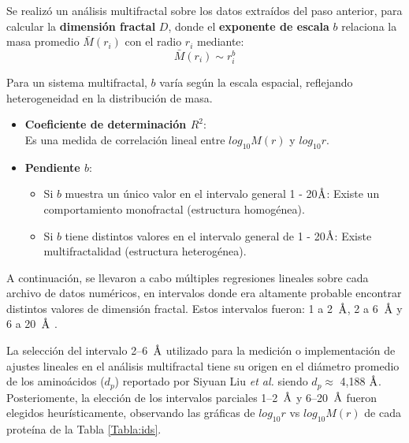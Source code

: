	Se realiz\'{o} un an\'{a}lisis multifractal sobre los datos extra\'{i}dos del paso anterior, para calcular la \textbf{dimensi\'{o}n fractal} $D$, donde el \textbf{exponente de escala} $b$  relaciona la masa  promedio $\bar{M}(r_i)$ con el radio $r_{i}$ mediante:
	\begin{equation}
		\bar{M}(r_i) \sim r_{i}^b
	\end{equation}
	
	Para un sistema multifractal, $b$ var\'{i}a seg\'{u}n la escala espacial, reflejando heterogeneidad en la distribuci\'{o}n de masa.
	\begin{itemize}
		\item \textbf{Coeficiente de determinaci\'{o}n $R^{2}$}: \\ Es una medida de correlaci\'{o}n lineal entre $log_{10}M(r)$ y $log_{10}r$.
		\item \textbf{Pendiente $b$}:
		\begin{itemize}
			\item Si $b$ muestra un \'{u}nico valor en el intervalo general 1 - 20$\textup{\r{A}}$: Existe un comportamiento monofractal (estructura homog\'{e}nea).
			\item Si $b$  tiene distintos valores en el intervalo general de 1 - 20$\textup{\r{A}}$: Existe multifractalidad (estructura heterog\'{e}nea).
		\end{itemize}
	\end{itemize}
	
	A continuaci\'{o}n, se llevaron a cabo m\'{u}ltiples regresiones lineales sobre cada archivo de datos num\'{e}ricos, en intervalos donde era altamente probable encontrar distintos valores de dimensi\'{o}n fractal. Estos intervalos fueron: 1 a 2~$\textup{\r{A}}$, 2 a 6~$\textup{\r{A}}$ y 6 a 20~$\textup{\r{A}}$ \cite{Enright2005, Liu2020}.	
	
	
	
	La selecci\'on del intervalo 2--6~$\textup{\r{A}}$ utilizado para la medici\'on o implementaci\'on de ajustes lineales en el an\'alisis multifractal tiene su origen en el di\'ametro promedio de los amino\'acidos ($d_p$) reportado por Siyuan Liu \textit{et al.}  siendo $d_p \approx$ 4,188 $\textup{\r{A}}$. Posteriomente, la elecci\'{o}n de los intervalos parciales 1--2~$\textup{\r{A}}$ y 6--20~$\textup{\r{A}}$ fueron elegidos heur\'{i}sticamente, observando las gr\'{a}ficas de $log_{10}r$ vs $log_{10}M(r)$ de cada prote\'{i}na de la Tabla \ref{Tabla:ids}.
	
